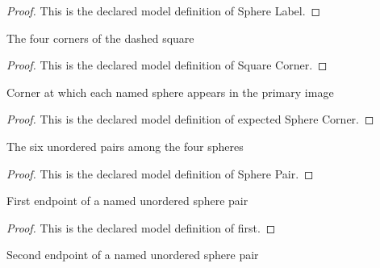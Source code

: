 \begin{proof}
  This is the declared model definition of Sphere Label.
\end{proof}
\begin{definition}
  \label{def:physics:phyx-mini-0864:phyxminiproblems-problemphyxmini0864-squarecorner}
  The four corners of the dashed square
\end{definition}
\begin{proof}
  This is the declared model definition of Square Corner.
\end{proof}
\begin{definition}
  \label{def:physics:phyx-mini-0864:phyxminiproblems-problemphyxmini0864-expectedspherecorner}
  Corner at which each named sphere appears in the primary image
\end{definition}
\begin{proof}
  This is the declared model definition of expected Sphere Corner.
\end{proof}
\begin{definition}
  \label{def:physics:phyx-mini-0864:phyxminiproblems-problemphyxmini0864-spherepair}
  The six unordered pairs among the four spheres
\end{definition}
\begin{proof}
  This is the declared model definition of Sphere Pair.
\end{proof}
\begin{definition}[first]
  \label{def:physics:phyx-mini-0864:phyxminiproblems-problemphyxmini0864-spherepair-first}
  First endpoint of a named unordered sphere pair
\end{definition}
\begin{proof}
  This is the declared model definition of first.
\end{proof}
\begin{definition}[second]
  \label{def:physics:phyx-mini-0864:phyxminiproblems-problemphyxmini0864-spherepair-second}
  Second endpoint of a named unordered sphere pair
\end{definition}
